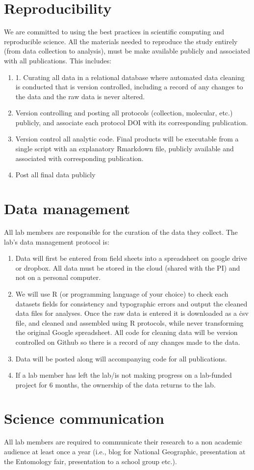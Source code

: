 \documentclass[12pt]{article}
\begin{document}
\section{Reproducibility}
We are committed to using the best practices in scientific computing
and reproducible science. All the
materials needed to reproduce the study entirely (from data collection
to analysis), must be make available publicly and associated with all
publications. This includes:
\begin{enumerate}
\item 1. Curating all data in a relational database where automated
  data cleaning is conducted that is version controlled, including a
  record of any changes to the data and the raw data is never altered.
\item Version controlling and posting all protocols (collection,
  molecular, etc.) publicly, and associate each protocol DOI with its
  corresponding publication.
\item Version control all analytic code. Final products will be
  executable from a single script with an explanatory Rmarkdown file,
  publicly available and associated with corresponding publication.
\item Post all final data publicly
\end{enumerate}

\section{Data management}
All lab members are responsible for the curation of the data they
collect. The lab's data management protocol is:

\begin{enumerate}
\item Data will first be entered from field sheets into a spreadsheet
  on google drive or dropbox. All data must be stored in the cloud
  (shared with the PI) and not on a personal computer.
\item We will use R (or programming language of your choice) to check
  each datasets fields for consistency and typographic errors and
  output the cleaned data files for analyses. Once the raw data is entered
  it is downloaded as a \.csv file, and cleaned and
  assembled using R protocols, while never transforming the original
  Google spreadsheet. All code for cleaning data will be version
  controlled on Github so there is a record of any changes made to the
  data.
\item Data will be posted along will accompanying code for all
  publications.
\item If a lab member has left the lab/is not making progress on a
  lab-funded project for 6 months, the ownership of the data returns
  to the lab.
\end{enumerate}

\section{Science communication}
All lab members are required to communicate their research to a non
academic audience at least once a year (i.e., blog for National
Geographic, presentation at the Entomology fair, presentation to a
school group etc.).
\end{document}
